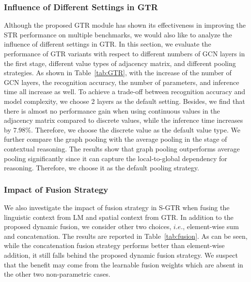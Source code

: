 \documentclass[letterpaper]{article} \usepackage{aaai22}  \usepackage{times}  \usepackage{helvet}  \usepackage{courier}  \usepackage[hyphens]{url}  \usepackage{graphicx} \urlstyle{rm} \def\UrlFont{\rm}  \usepackage{natbib}  \usepackage{caption} \DeclareCaptionStyle{ruled}{labelfont=normalfont,labelsep=colon,strut=off} \frenchspacing  \setlength{\pdfpagewidth}{8.5in}  \setlength{\pdfpageheight}{11in}
\begin{document}
\subsubsection{Influence of Different Settings in GTR}
Although the proposed GTR module has shown its effectiveness in improving the STR performance on multiple benchmarks, we would also like to analyze the influence of different settings in GTR. In this section, we evaluate the performance of GTR variants with respect to different numbers of GCN layers in the first stage, different value types of adjacency matrix, and different pooling strategies. As shown in Table~\ref{tab:GTR}, with the increase of the number of GCN layers, the recognition accuracy, the number of parameters, and inference time all increase as well. To achieve a trade-off between recognition accuracy and model complexity, we choose 2 layers as the default setting. Besides, we find that there is almost no performance gain when using continuous values in the adjacency matrix compared to discrete values, while the inference time increases by $7.98\%$. Therefore, we choose the discrete value as the default value type. We further compare the graph pooling with the average pooling in the stage of contextual reasoning. The results show that graph pooling outperforms average pooling significantly since it can capture the local-to-global dependency for reasoning. Therefore, we choose it as the default pooling strategy.


\begin{table}
\caption{Empirical study of the fusion strategy in S-GTR. ``Add'': element-wise addition. ``Concat'': Concatenation. ``D-fuse'': Dynamic fusion.}
\label{tab:fusion}
\end{table}


\subsubsection{Impact of Fusion Strategy}
We also investigate the impact of fusion strategy in S-GTR when fusing the linguistic context from LM and spatial context from GTR. In addition to the proposed dynamic fusion, we consider other two choices, $i.e.$, element-wise sum and concatenation. The results are reported in Table~\ref{tab:fusion}. As can be seen, while the concatenation fusion strategy performs better than element-wise addition, it still falls behind the proposed dynamic fusion strategy. We suspect that the benefit may come from the learnable fusion weights which are absent in the other two non-parametric cases.
\end{document}
